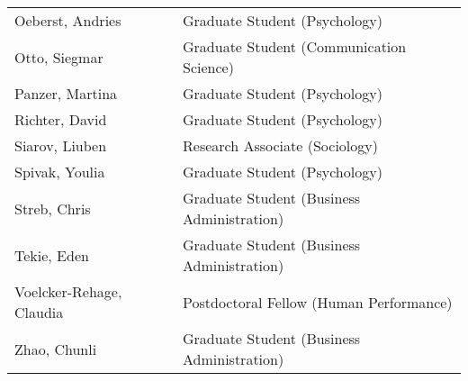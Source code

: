 \begin{tabular}{lp{8cm}}
Oeberst, Andries	&		Graduate Student (Psychology)\\[0.8ex]

Otto, Siegmar		&		Graduate Student (Communication Science)\\[0.8ex]

Panzer, Martina	&		Graduate Student (Psychology)\\[0.8ex]

Richter, David	&			Graduate Student (Psychology)\\[0.8ex]

Siarov, Liuben	&			Research Associate (Sociology)\\[0.8ex]

Spivak, Youlia	&			Graduate Student (Psychology)\\[0.8ex]

Streb, Chris		&		Graduate Student (Business Administration)\\[0.8ex]

Tekie, Eden			&	Graduate Student (Business Administration)\\[0.8ex]

Voelcker-Rehage, Claudia	&	Postdoctoral Fellow (Human Performance)\\[0.8ex]

Zhao, Chunli		&		Graduate Student (Business Administration)
\end{tabular}